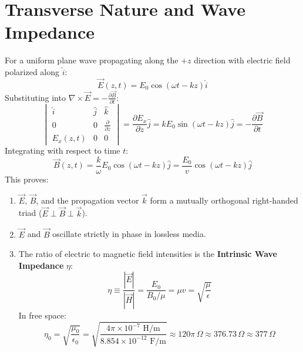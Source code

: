 \section{Transverse Nature and Wave Impedance}
For a uniform plane wave propagating along the $+z$ direction with electric field polarized along $\hat{i}$:
\begin{equation}
\vec{E}(z,t) = E_0 \cos(\omega t - kz)\hat{i}
\end{equation}
Substituting into $\nabla \times \vec{E} = -\frac{\partial \vec{B}}{\partial t}$:
\begin{equation}
\begin{vmatrix}
\hat{i} & \hat{j} & \hat{k} \\
0 & 0 & \frac{\partial}{\partial z} \\
E_x(z,t) & 0 & 0
\end{vmatrix} = \frac{\partial E_x}{\partial z}\hat{j} = k E_0 \sin(\omega t - kz)\hat{j} = -\frac{\partial \vec{B}}{\partial t}
\end{equation}
Integrating with respect to time $t$:
\begin{equation}
\vec{B}(z,t) = \frac{k}{\omega} E_0 \cos(\omega t - kz)\hat{j} = \frac{E_0}{v}\cos(\omega t - kz)\hat{j}
\end{equation}
This proves:
\begin{enumerate}[itemsep=2pt]
    \item $\vec{E}$, $\vec{B}$, and the propagation vector $\vec{k}$ form a mutually orthogonal right-handed triad ($\vec{E} \perp \vec{B} \perp \vec{k}$).
    \item $\vec{E}$ and $\vec{B}$ oscillate strictly in phase in lossless media.
    \item The ratio of electric to magnetic field intensities is the \textbf{Intrinsic Wave Impedance} $\eta$:
    \begin{equation}
    \eta \equiv \frac{|\vec{E}|}{|\vec{H}|} = \frac{E_0}{B_0 / \mu} = \mu v = \sqrt{\frac{\mu}{\epsilon}}
    \end{equation}
    In free space:
    \begin{equation}
    \eta_0 = \sqrt{\frac{\mu_0}{\epsilon_0}} = \sqrt{\frac{4\pi \times 10^{-7}\text{ H/m}}{8.854 \times 10^{-12}\text{ F/m}}} \approx 120\pi\,\Omega \approx 376.73\,\Omega \approx 377\,\Omega
    \end{equation}
\end{enumerate}

